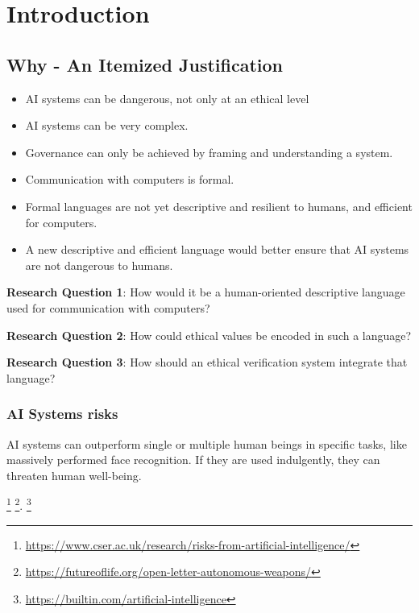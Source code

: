 \chapter{Introduction}

\newcommand{\question}[1]{\textit{#1}}

\newcommand{\comment}[1]{{#1}}


\section{Why - An Itemized Justification}

\begin{itemize}
    \item AI systems can be dangerous, not only at an ethical level
    \item AI systems can be very complex.
    \item Governance can only be achieved by framing and understanding a system.~\cite{doi:10.1145/3278721.3278745}
    \item Communication with computers is formal.
    \item Formal languages are not yet descriptive and resilient to humans, and efficient for computers.
    \item A new descriptive and efficient language would better ensure that AI systems are not dangerous to humans.
\end{itemize}



\textbf{Research Question 1}: How would it be a human-oriented descriptive language used for communication with computers?


\textbf{Research Question 2}: How could ethical values be encoded in such a language?


\textbf{Research Question 3}: How should an ethical verification system integrate that language?

\subsection{AI Systems risks}

AI systems can outperform single or multiple human beings in specific tasks, like massively performed face recognition.
If they are used indulgently, they can threaten human well-being.

\footnote{\url{https://www.cser.ac.uk/research/risks-from-artificial-intelligence/}}
\footnote{\url{https://futureoflife.org/open-letter-autonomous-weapons/}}.
\footnote{\url{https://builtin.com/artificial-intelligence}}

